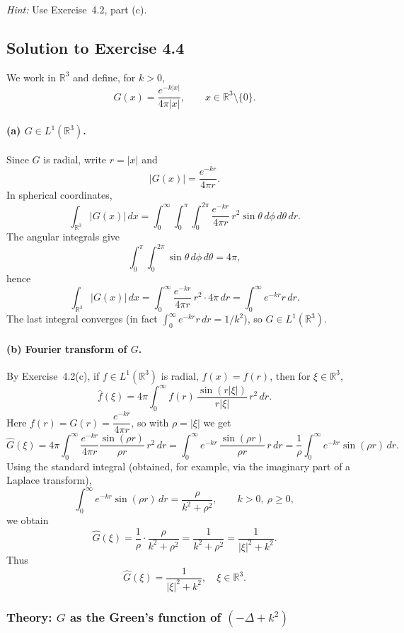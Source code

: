 \documentclass[12pt,a4paper]{article}
\theoremstyle{plain}
\theoremstyle{definition}
\theoremstyle{remark}
\theoremstyle{remark}
\begin{document}
\noindent\emph{Hint:} Use Exercise~4.2, part (c).

\subsection*{Solution to Exercise 4.4}

We work in $\mathbb{R}^3$ and define, for $k>0$,
\[
G(x) = \frac{e^{-k|x|}}{4\pi |x|}, \qquad x\in\mathbb{R}^3\setminus\{0\}.
\]

\paragraph{(a) $G\in L^1(\mathbb{R}^3)$.}
Since $G$ is radial, write $r=|x|$ and
\[
|G(x)| = \frac{e^{-kr}}{4\pi r}.
\]
In spherical coordinates,
\[
\int_{\mathbb{R}^3} |G(x)|\,dx
= \int_0^\infty\int_0^\pi\int_0^{2\pi}
\frac{e^{-kr}}{4\pi r}\,r^2\sin\theta\,d\phi\,d\theta\,dr.
\]
The angular integrals give
\[
\int_0^\pi\int_0^{2\pi}\sin\theta\,d\phi\,d\theta
= 4\pi,
\]
hence
\[
\int_{\mathbb{R}^3} |G(x)|\,dx
= \int_0^\infty \frac{e^{-kr}}{4\pi r}\,r^2\cdot 4\pi\,dr
= \int_0^\infty e^{-kr}r\,dr.
\]
The last integral converges (in fact $\int_0^\infty e^{-kr}r\,dr = 1/k^2$),
so $G\in L^1(\mathbb{R}^3)$.

\paragraph{(b) Fourier transform of $G$.}
By Exercise~4.2(c), if $f\in L^1(\mathbb{R}^3)$ is radial, $f(x)=f(r)$,
then for $\xi\in\mathbb{R}^3$,
\[
\widehat{f}(\xi)
= 4\pi\int_0^\infty f(r)\,\frac{\sin(r|\xi|)}{r|\xi|}\,r^2\,dr.
\]
Here $f(r)=G(r)=\dfrac{e^{-kr}}{4\pi r}$, so with $\rho=|\xi|$ we get
\[
\widehat{G}(\xi)
= 4\pi\int_0^\infty \frac{e^{-kr}}{4\pi r}
\frac{\sin(\rho r)}{\rho r}\,r^2\,dr
= \int_0^\infty e^{-kr}\,\frac{\sin(\rho r)}{\rho r}\,r\,dr
= \frac{1}{\rho}\int_0^\infty e^{-kr}\sin(\rho r)\,dr.
\]
Using the standard integral (obtained, for example, via the imaginary part of
a Laplace transform),
\[
\int_0^\infty e^{-kr}\sin(\rho r)\,dr
= \frac{\rho}{k^2+\rho^2}, \qquad k>0,\ \rho\ge 0,
\]
we obtain
\[
\widehat{G}(\xi)
= \frac{1}{\rho}\cdot\frac{\rho}{k^2+\rho^2}
= \frac{1}{k^2+\rho^2}
= \frac{1}{|\xi|^2 + k^2}.
\]
Thus
\[
\boxed{\widehat{G}(\xi) = \frac{1}{|\xi|^2 + k^2},\quad \xi\in\mathbb{R}^3.}
\]

\subsubsection*{Theory: $G$ as the Green's function of $(-\Delta + k^2)$}
\end{document}
